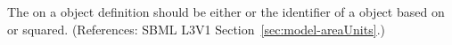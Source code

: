 The  on a \Model object definition should be either
 or the identifier of a \UnitDefinition object based
on  or  squared.  (References: SBML L3V1
Section~\ref{sec:model-areaUnits}.)
